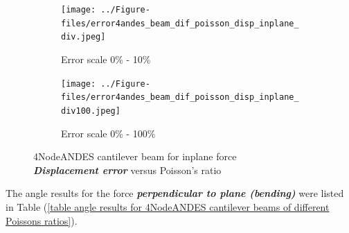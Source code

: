 \documentclass[fleqn,11pt]{article}
\begin{document}


\begin{figure}[H]
  \begin{subfigure}{0.5\textwidth}
    \centering
    \texttt{[image: ../Figure-files/error4andes\_beam\_dif\_poisson\_disp\_inplane\_div.jpeg]}
    \caption{Error scale 0\% - 10\%}
  \end{subfigure}
  \begin{subfigure}{0.5\textwidth}
    \centering
    \texttt{[image: ../Figure-files/error4andes\_beam\_dif\_poisson\_disp\_inplane\_div100.jpeg]}
    \caption{Error scale 0\% - 100\%}
  \end{subfigure}
  \captionsetup{justification=centering,margin=2cm}
  \caption{4NodeANDES cantilever beam for inplane force\\
      \emph{\textbf{Displacement error}}   versus   Poisson's ratio}
  \label{table Displacement error 4NodeANDES cantilever beam for different Poisson ratio 2}
\end{figure}



The angle results for the force \textbf{\emph{perpendicular to plane (bending)}} were listed in Table (\ref{table angle results for 4NodeANDES cantilever beams of different Poissons ratios}). 
\end{document}
